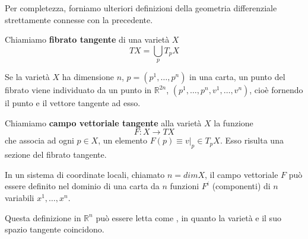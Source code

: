 Per completezza, forniamo ulteriori definizioni della geometria differenziale strettamente connesse con la precedente.
\begin{definizione}
Chiamiamo \textbf{fibrato tangente} di una varietà $X$
\begin{equation*}
    TX = \bigcup_p T_p X
\end{equation*}
\end{definizione}
Se la varietà $X$ ha dimensione $n$, $p=(p^1,\dots, p^n)$ in una carta, un punto del fibrato viene individuato da un punto in $\mathbb{R}^{2n}$, $(p^1, \dots, p^n, v^1, \dots, v^n)$, cioè fornendo il punto e il vettore tangente ad esso.

\begin{definizione}
Chiamiamo \textbf{campo vettoriale tangente} alla varietà $X$ la funzione
\begin{equation*}
    F: X \rightarrow TX
\end{equation*}
che associa ad ogni $p \in X$, un elemento $F(p)\equiv v|_p \in T_p X$. Esso risulta una sezione del fibrato tangente.
\end{definizione}

In un sistema di coordinate locali, chiamato $n=dimX$, il campo vettoriale $F$ può essere definito nel dominio di una carta da $n$ funzioni $F^i$ (componenti) di $n$ variabili $x^1,\dots, x^n$.

Questa definizione in $\mathbb{R}^n$ può essere letta come , in quanto la varietà e il suo spazio tangente coincidono.

